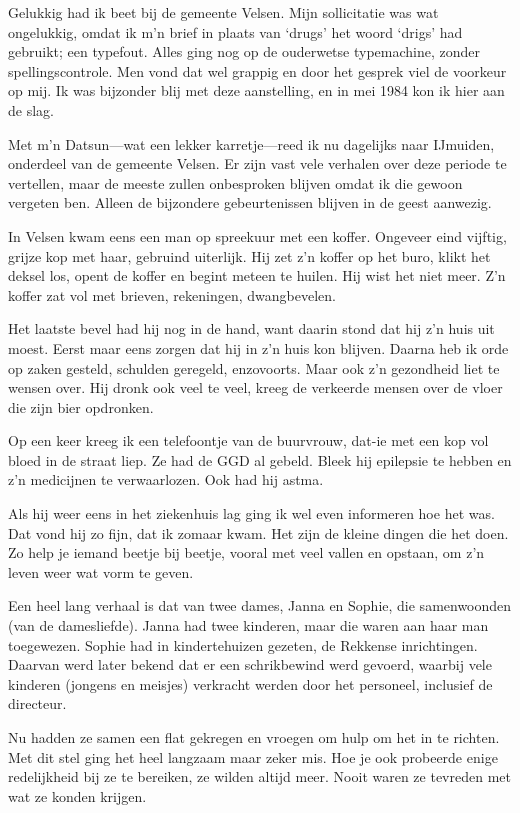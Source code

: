 \documentclass[10pt,twoside,openright]{memoir}
\begin{document}
Gelukkig had ik beet bij de gemeente Velsen. Mijn sollicitatie was wat ongelukkig, omdat ik m’n brief in plaats van `drugs' het woord `drigs' had gebruikt; een typefout. Alles ging nog op de ouderwetse typemachine, zonder spellingscontrole. Men vond dat wel grappig en door het gesprek viel de voorkeur op mij. Ik was bijzonder blij met deze aanstelling, en in mei 1984 kon ik hier aan de slag.

Met m’n Datsun---wat een lekker karretje---reed ik nu dagelijks naar IJmuiden, onderdeel van de gemeente Velsen. Er zijn vast vele verhalen over deze periode te vertellen, maar de meeste zullen onbesproken blijven omdat ik die gewoon vergeten ben. Alleen de bijzondere gebeurtenissen blijven in de geest aanwezig.

In Velsen kwam eens een man op spreekuur met een koffer. Ongeveer eind vijftig, grijze kop met haar, gebruind uiterlijk. Hij zet z’n koffer op het buro, klikt het deksel los, opent de koffer en begint meteen te huilen. Hij wist het niet meer. Z’n koffer zat vol met brieven, rekeningen, dwangbevelen. 

Het laatste bevel had hij nog in de hand, want daarin stond dat hij z’n huis uit moest. Eerst maar eens zorgen dat hij in z’n huis kon blijven. Daarna heb ik orde op zaken gesteld, schulden geregeld, enzovoorts. Maar ook z’n gezondheid liet te wensen over. Hij dronk ook veel te veel, kreeg de verkeerde mensen over de vloer die zijn bier opdronken. 

Op een keer kreeg ik een telefoontje van de buurvrouw, dat-ie met een kop vol bloed in de straat liep. Ze had de GGD al gebeld. Bleek hij epilepsie te hebben en z’n medicijnen te verwaarlozen. Ook had hij astma. 

Als hij weer eens in het ziekenhuis lag ging ik wel even informeren hoe het was. Dat vond hij zo fijn, dat ik zomaar kwam. Het zijn de kleine dingen die het doen. Zo help je iemand beetje bij beetje, vooral met veel vallen en opstaan, om z’n leven weer wat vorm te geven.

Een heel lang verhaal is dat van twee dames, Janna en Sophie, die samenwoonden (van de damesliefde). Janna had twee kinderen, maar die waren aan haar man toegewezen. Sophie had in kindertehuizen gezeten, de Rekkense inrichtingen. Daarvan werd later bekend dat er een schrikbewind werd gevoerd, waarbij vele kinderen (jongens en meisjes) verkracht werden door het personeel, inclusief de directeur. 

Nu hadden ze samen een flat gekregen en vroegen om hulp om het in te richten. Met dit stel ging het heel langzaam maar zeker mis. Hoe je ook probeerde enige redelijkheid bij ze te bereiken, ze wilden altijd meer. Nooit waren ze tevreden met wat ze konden krijgen. 
\end{document}
